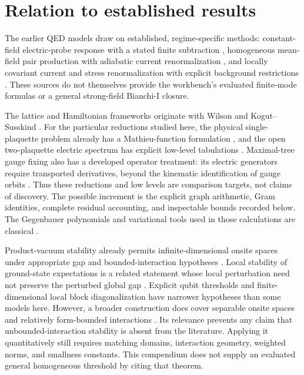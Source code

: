 \section{Relation to established results}
\label{sec:related-work}
The earlier QED models draw on established, regime-specific methods:
constant-field electric-probe response with a stated finite subtraction
\cite{mages2010euler}, homogeneous mean-field pair production with
adiabatic current renormalization \cite{kluger1993pair}, and locally
covariant current and stress renormalization with explicit background
restrictions \cite{zahn2014dirac}. These sources do not themselves
provide the workbench's evaluated finite-mode formulas or a general
strong-field Bianchi-I closure.

The lattice and Hamiltonian frameworks originate with Wilson and
Kogut--Susskind \cite{wilson1974confinement,kogut1975hamiltonian}.
For the particular reductions studied here, the physical single-plaquette
problem already has a Mathieu-function formulation
\cite[Appendix B]{bauer2023basis}, and the open two-plaquette electric
spectrum has explicit low-level tabulations
\cite[Appendix C]{froland2025two}.
Maximal-tree gauge fixing also has a developed operator treatment: its
electric generators require transported derivatives, beyond the kinematic
identification of gauge orbits \cite[Appendix C]{burbano2024gauge}.
Thus these reductions and low levels are comparison targets, not claims
of discovery. The possible increment is the explicit graph arithmetic,
Gram identities, complete residual accounting, and inspectable bounds
recorded below. The Gegenbauer polynomials and variational tools used in
those calculations are classical
\cite{nistDLMFGegenbauer,teschl2014methods}.

Product-vacuum stability already permits infinite-dimensional onsite
spaces under appropriate gap and bounded-interaction hypotheses
\cite{yarotsky2004quasiparticles}. Local stability of ground-state
expectations is a related statement whose local perturbation need not
preserve the perturbed global gap \cite[Theorem 3]{henheik2022local}.
Explicit qubit thresholds \cite{bravyi2008polynomial} and finite-dimensional
local block diagonalization \cite{delvecchio2022local} have narrower
hypotheses than some models here. However, a broader construction does
cover separable onsite spaces and relatively form-bounded interactions
\cite{delvecchio2021unbounded}. Its relevance prevents any claim that
unbounded-interaction stability is absent from the literature. Applying
it quantitatively still requires matching domains, interaction geometry,
weighted norms, and smallness constants. This compendium does not supply
an evaluated general homogeneous threshold by citing that theorem.

